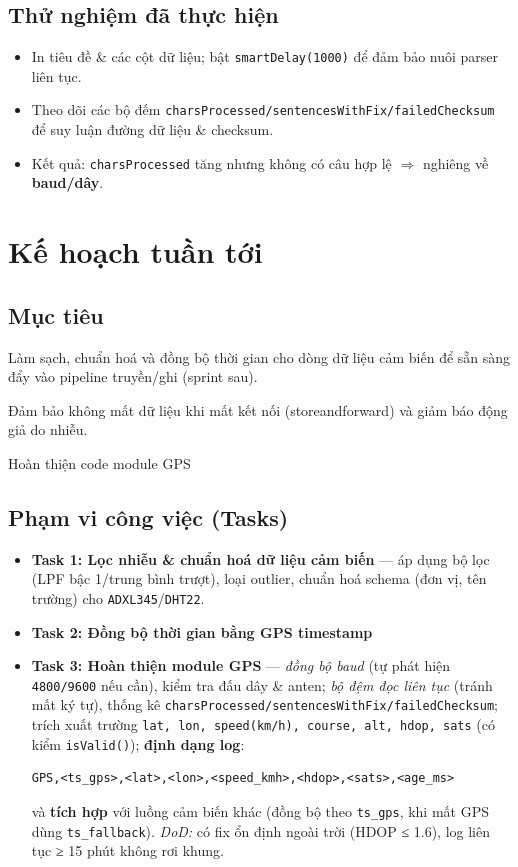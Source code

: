 \subsection*{Thử nghiệm đã thực hiện}
\begin{itemize}
  \item In tiêu đề \& các cột dữ liệu; bật \texttt{smartDelay(1000)} để đảm bảo nuôi parser liên tục.
  \item Theo dõi các bộ đếm \texttt{charsProcessed/sentencesWithFix/failedChecksum} để suy luận đường dữ liệu \& checksum.
  \item Kết quả: \texttt{charsProcessed} tăng nhưng không có câu hợp lệ $\Rightarrow$ nghiêng về \textbf{baud/dây}.
\end{itemize}
\section{Kế hoạch tuần tới }

\subsection*{Mục tiêu}

Làm sạch, chuẩn hoá và đồng bộ thời gian cho dòng dữ liệu cảm biến để sẵn sàng đẩy vào pipeline truyền/ghi (sprint sau).

Đảm bảo không mất dữ liệu khi mất kết nối (store\text{-}and\text{-}forward) và giảm báo động giả do nhiễu.

Hoàn thiện code module GPS

\subsection*{Phạm vi công việc (Tasks)}
\begin{itemize}
\item \textbf{Task 1: Lọc nhiễu & chuẩn hoá dữ liệu cảm biến} — áp dụng bộ lọc (LPF bậc 1/trung bình trượt), loại outlier, chuẩn hoá schema (đơn vị, tên trường) cho \texttt{ADXL345}/\texttt{DHT22}.

\item \textbf{Task 2: Đồng bộ thời gian bằng GPS timestamp}

\item \textbf{Task 3: Hoàn thiện module GPS} — \emph{đồng bộ baud} (tự phát hiện \texttt{4800/9600} nếu cần), kiểm tra đấu dây & anten; \emph{bộ đệm đọc liên tục} (tránh mất ký tự), thống kê \texttt{charsProcessed/sentencesWithFix/failedChecksum}; trích xuất trường \texttt{lat, lon, speed(km/h), course, alt, hdop, sats} (có kiểm \texttt{isValid()}); \textbf{định dạng log}:
\begin{verbatim}
GPS,<ts_gps>,<lat>,<lon>,<speed_kmh>,<hdop>,<sats>,<age_ms>
\end{verbatim}
và \textbf{tích hợp} với luồng cảm biến khác (đồng bộ theo \texttt{ts\_gps}, khi mất GPS dùng \texttt{ts\_fallback}). \emph{DoD:} có fix ổn định ngoài trời (HDOP ≤ 1.6), log liên tục ≥ 15 phút không rơi khung.
\end{itemize}